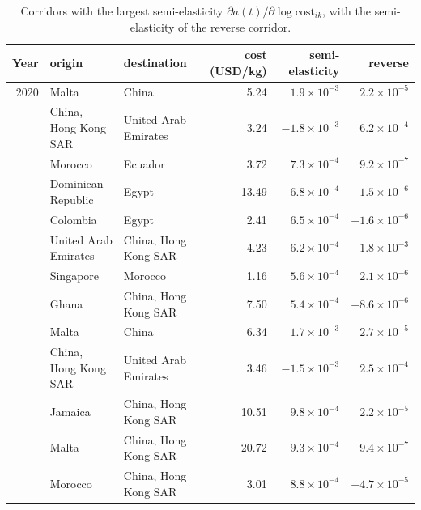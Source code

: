 \begin{table}[h]
\caption{Corridors with the largest semi-elasticity $\partial a(t)/\partial\log\mathrm{cost}_{ik}$, with the semi-elasticity of the reverse corridor.}\label{tab:senscorr}
\centering\footnotesize
\begin{tabular}{rllrrr}
\toprule
Year & origin & destination & cost (USD/kg) & semi-elasticity & reverse\\
\midrule
2020 & Malta & China & 5.24 & $1.9\times10^{-3}$ & $2.2\times10^{-5}$\\
 & China, Hong Kong SAR & United Arab Emirates & 3.24 & $-1.8\times10^{-3}$ & $6.2\times10^{-4}$\\
 & Morocco & Ecuador & 3.72 & $7.3\times10^{-4}$ & $9.2\times10^{-7}$\\
 & Dominican Republic & Egypt & 13.49 & $6.8\times10^{-4}$ & $-1.5\times10^{-6}$\\
 & Colombia & Egypt & 2.41 & $6.5\times10^{-4}$ & $-1.6\times10^{-6}$\\
 & United Arab Emirates & China, Hong Kong SAR & 4.23 & $6.2\times10^{-4}$ & $-1.8\times10^{-3}$\\
 & Singapore & Morocco & 1.16 & $5.6\times10^{-4}$ & $2.1\times10^{-6}$\\
 & Ghana & China, Hong Kong SAR & 7.50 & $5.4\times10^{-4}$ & $-8.6\times10^{-6}$\\
\addlinespace
2021 & Malta & China & 6.34 & $1.7\times10^{-3}$ & $2.7\times10^{-5}$\\
 & China, Hong Kong SAR & United Arab Emirates & 3.46 & $-1.5\times10^{-3}$ & $2.5\times10^{-4}$\\
 & Jamaica & China, Hong Kong SAR & 10.51 & $9.8\times10^{-4}$ & $2.2\times10^{-5}$\\
 & Malta & China, Hong Kong SAR & 20.72 & $9.3\times10^{-4}$ & $9.4\times10^{-7}$\\
 & Morocco & China, Hong Kong SAR & 3.01 & $8.8\times10^{-4}$ & $-4.7\times10^{-5}$\\
\bottomrule
\end{tabular}
\end{table}

